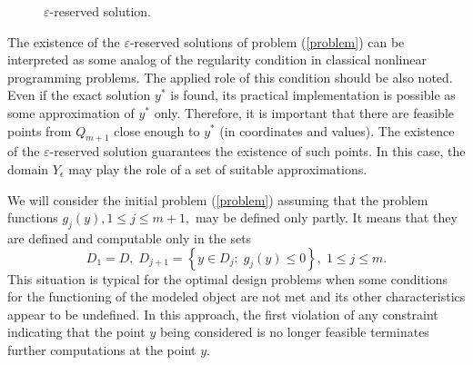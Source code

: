 \documentclass[preprint]{elsarticle}
\begin{document}
\begin{figure}%
	\caption{$\varepsilon$-reserved solution.}
	\label{fig:eps_reserved_solution}
\end{figure}

	The existence of the $\varepsilon$-reserved solutions of problem (\ref{problem}) can be interpreted as some analog of the regularity condition in classical nonlinear programming problems. The applied role of this condition should be also noted. Even if the exact solution $y^\ast$ is found, its practical implementation is possible as some approximation of $y^\ast$ only. Therefore, it is important that there are feasible points from $Q_{m+1}$ close enough to $y^\ast$ (in coordinates and values). The existence of the $\varepsilon$-reserved solution guarantees the existence of such points. In this case, the domain $Y_{\epsilon}$ may play the role of a set of suitable approximations.

	We will consider the initial problem (\ref{problem}) assuming that the problem functions $g_{j}(y), 1 \leq j \leq m+1,$ may be defined only partly. It means that they are defined and computable only in the sets 
\begin{equation}\label{D_sets}
	D_1 = D, \; D_{j+1} = \left\{ y \in D_j: \; g_j(y) \leq 0 \right\}, \; 1 \leq j \leq m.
\end{equation}
This situation is typical for the optimal design problems when some conditions for the functioning of the modeled object are not met and its other characteristics appear to be undefined. In this approach, the first violation of any constraint indicating that the point $y$ being considered is no longer feasible terminates further computations at the point $y$.
\end{document}

